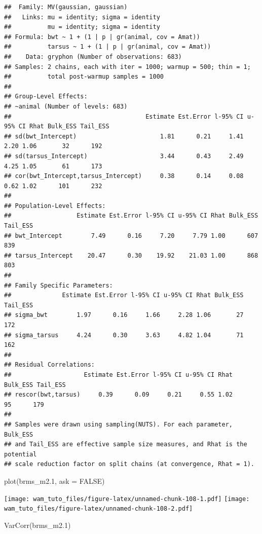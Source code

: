 \documentclass[
  12pt,
]{book}
\newenvironment{Shaded}{\begin{snugshade}}{\end{snugshade}}
\newcommand{\AttributeTok}[1]{\textcolor[rgb]{0.77,0.63,0.00}{#1}}
\newcommand{\ConstantTok}[1]{\textcolor[rgb]{0.00,0.00,0.00}{#1}}
\newcommand{\FloatTok}[1]{\textcolor[rgb]{0.00,0.00,0.81}{#1}}
\newcommand{\FunctionTok}[1]{\textcolor[rgb]{0.00,0.00,0.00}{#1}}
\newcommand{\NormalTok}[1]{#1}
\begin{document}
\begin{verbatim}
##  Family: MV(gaussian, gaussian) 
##   Links: mu = identity; sigma = identity
##          mu = identity; sigma = identity 
## Formula: bwt ~ 1 + (1 | p | gr(animal, cov = Amat)) 
##          tarsus ~ 1 + (1 | p | gr(animal, cov = Amat)) 
##    Data: gryphon (Number of observations: 683) 
## Samples: 2 chains, each with iter = 1000; warmup = 500; thin = 1;
##          total post-warmup samples = 1000
## 
## Group-Level Effects: 
## ~animal (Number of levels: 683) 
##                                     Estimate Est.Error l-95% CI u-95% CI Rhat Bulk_ESS Tail_ESS
## sd(bwt_Intercept)                       1.81      0.21     1.41     2.20 1.06       32      192
## sd(tarsus_Intercept)                    3.44      0.43     2.49     4.25 1.05       61      173
## cor(bwt_Intercept,tarsus_Intercept)     0.38      0.14     0.08     0.62 1.02      101      232
## 
## Population-Level Effects: 
##                  Estimate Est.Error l-95% CI u-95% CI Rhat Bulk_ESS Tail_ESS
## bwt_Intercept        7.49      0.16     7.20     7.79 1.00      607      839
## tarsus_Intercept    20.47      0.30    19.92    21.03 1.00      868      803
## 
## Family Specific Parameters: 
##              Estimate Est.Error l-95% CI u-95% CI Rhat Bulk_ESS Tail_ESS
## sigma_bwt        1.97      0.16     1.66     2.28 1.06       27      172
## sigma_tarsus     4.24      0.30     3.63     4.82 1.04       71      162
## 
## Residual Correlations: 
##                    Estimate Est.Error l-95% CI u-95% CI Rhat Bulk_ESS Tail_ESS
## rescor(bwt,tarsus)     0.39      0.09     0.21     0.55 1.02       95      179
## 
## Samples were drawn using sampling(NUTS). For each parameter, Bulk_ESS
## and Tail_ESS are effective sample size measures, and Rhat is the potential
## scale reduction factor on split chains (at convergence, Rhat = 1).
\end{verbatim}

\begin{Shaded}
\begin{Highlighting}[]
\FunctionTok{plot}\NormalTok{(brms\_m2}\FloatTok{.1}\NormalTok{, }\AttributeTok{ask =} \ConstantTok{FALSE}\NormalTok{)}
\end{Highlighting}
\end{Shaded}

\texttt{[image: wam\_tuto\_files/figure-latex/unnamed-chunk-108-1.pdf]} \texttt{[image: wam\_tuto\_files/figure-latex/unnamed-chunk-108-2.pdf]}

\begin{Shaded}
\begin{Highlighting}[]
\FunctionTok{VarCorr}\NormalTok{(brms\_m2}\FloatTok{.1}\NormalTok{)}
\end{Highlighting}
\end{Shaded}
\end{document}
